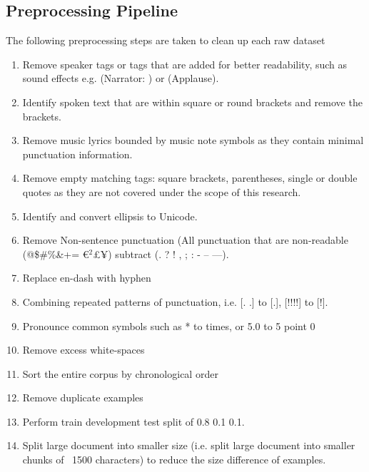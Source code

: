 \documentclass[a4paper]{article}
\begin{document}
\begin{multicols}{2}
\begin{appendices}
\section{Preprocessing Pipeline} \label{preprocessing}
The following preprocessing steps are taken to clean up each raw dataset
\begin{enumerate}
\item Remove speaker tags or tags that are added for better readability, such as sound effects e.g. (Narrator: ) or (Applause).
\item Identify spoken text that are within square or round brackets and remove the brackets.
\item Remove music lyrics bounded by music note symbols as they contain minimal punctuation information.
\item Remove empty matching tags: square brackets, parentheses, single or double quotes as they are not covered under the scope of this research.
\item Identify and convert ellipsis to Unicode.
\item Remove Non-sentence punctuation (All punctuation that are non-readable (@\$\#\%\&+\textbullet= €$ ^2$£¥) subtract (. ? ! , ; : - – —).
\item Replace en-dash with hyphen
\item Combining repeated patterns of punctuation, i.e. [. .] to [.], [!!!!] to [!].
\item Pronounce common symbols such as * to times, or 5.0 to 5 point 0
\item Remove excess white-spaces
\item Sort the entire corpus by chronological order
\item Remove duplicate examples
\item Perform train development test split of 0.8 0.1 0.1.
\item Split large document into smaller size  (i.e. split large document into smaller chunks of ~1500 characters) to reduce the size difference of examples.
\end{enumerate}

\begin{table*}[t]
\centering
\begin{tabular}{|c|c|c|c|c|c|c|c|c|c|c|c|c|}


\end{tabular}
\end{table*}
\end{appendices}
\end{multicols}
\end{document}
